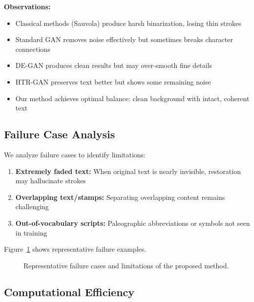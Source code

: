 \documentclass[journal]{IEEEtran}
\begin{document}
\textbf{Observations:}
\begin{itemize}
    \item Classical methods (Sauvola) produce harsh binarization, losing thin strokes
    \item Standard GAN removes noise effectively but sometimes breaks character connections
    \item DE-GAN produces clean results but may over-smooth fine details
    \item HTR-GAN preserves text better but shows some remaining noise
    \item Our method achieves optimal balance: clean background with intact, coherent text
\end{itemize}

\subsection{Failure Case Analysis}

We analyze failure cases to identify limitations:

\begin{enumerate}
    \item \textbf{Extremely faded text:} When original text is nearly invisible, restoration may hallucinate strokes
    \item \textbf{Overlapping text/stamps:} Separating overlapping content remains challenging
    \item \textbf{Out-of-vocabulary scripts:} Paleographic abbreviations or symbols not seen in training
\end{enumerate}

Figure~\ref{fig:failure_cases} shows representative failure examples.

\begin{figure}[!t]
\centering
\caption{Representative failure cases and limitations of the proposed method.}
\label{fig:failure_cases}
\end{figure}

\subsection{Computational Efficiency}
\end{document}
